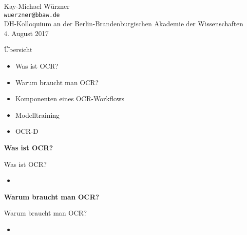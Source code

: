 \documentclass{bbawslides}
\begin{document}
\providecommand{\Title}{}


\begin{bbawtitle}
  \vspace*{3em}%
  Kay-Michael Würzner\\[-.25em]%
  \textcolor{urlColor}{\texttt{{\small wuerzner@bbaw.de}}}
  \\[3em]
  {\footnotesize{%
    DH-Kolloquium an der Berlin-Brandenburgischen Akademie der Wissenschaften\\%
    4. August 2017\\%
  }}
\end{bbawtitle}
\slideStyleFrame

\renewcommand{\footerText}{\tiny 4. August 2017, DH-Kolloquium, BBAW}

\begin{bbawslide}{Übersicht}
  \vspace*{7mm}%
  \centerslidestrue%
  \begin{itemize}
  \item Was ist OCR?
  \item Warum braucht man OCR?
  \item Komponenten eines OCR-Workflows
  \item Modelltraining
  \item OCR-D
  \end{itemize}
\end{bbawslide}

\begin{bbawpart}{\Large\bf Was ist OCR?}
\end{bbawpart}

\begin{bbawslide}{Was ist OCR?}
  \vspace*{7mm}%
  \centerslidestrue%
  \begin{itemize}
    \item
  \end{itemize}
\end{bbawslide}

\begin{bbawpart}{\Large\bf Warum braucht man OCR?}
\end{bbawpart}

\begin{bbawslide}{Warum braucht man OCR?}
  \vspace*{7mm}%
  \centerslidestrue%
  \begin{itemize}
    \item
  \end{itemize}
\end{bbawslide}
\end{document}
